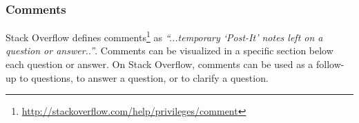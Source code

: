 \documentclass{sig-alternate-05-2015}
\begin{document}







\subsubsection*{Comments}
	Stack Overflow defines comments\footnote{\url{http://stackoverflow.com/help/privileges/comment}} as \textit{``...temporary `Post-It' notes left on a question or answer..''}.
	Comments can be visualized in a specific section below each question or answer.
	On Stack Overflow, comments can be used as a follow-up to questions, to answer a question, or to clarify a question.
\end{document}
